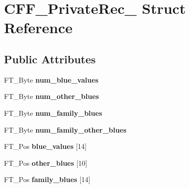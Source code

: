 \hypertarget{struct_c_f_f___private_rec__}{}\section{C\+F\+F\+\_\+\+Private\+Rec\+\_\+ Struct Reference}
\label{struct_c_f_f___private_rec__}
\subsection*{Public Attributes}
\begin{DoxyCompactItemize}
\item 
\mbox{\label{struct_c_f_f___private_rec___a0cb80c682054b8164c7acf80268f2129}} 
F\+T\+\_\+\+Byte {\bfseries num\+\_\+blue\+\_\+values}
\item 
\mbox{\label{struct_c_f_f___private_rec___a9b243fb3076cb047103f9e4cd4e97e92}} 
F\+T\+\_\+\+Byte {\bfseries num\+\_\+other\+\_\+blues}
\item 
\mbox{\label{struct_c_f_f___private_rec___a8fa5567b17831b3b9449c8866de46cdc}} 
F\+T\+\_\+\+Byte {\bfseries num\+\_\+family\+\_\+blues}
\item 
\mbox{\label{struct_c_f_f___private_rec___aa6896d394b3e2aaba96ae2938f515e13}} 
F\+T\+\_\+\+Byte {\bfseries num\+\_\+family\+\_\+other\+\_\+blues}
\item 
\mbox{\label{struct_c_f_f___private_rec___a892cbb15929f6abea66c011d62f7512e}} 
F\+T\+\_\+\+Pos {\bfseries blue\+\_\+values} \mbox{[}14\mbox{]}
\item 
\mbox{\label{struct_c_f_f___private_rec___a4c06566ee6e92c12d34b7d90025df5d6}} 
F\+T\+\_\+\+Pos {\bfseries other\+\_\+blues} \mbox{[}10\mbox{]}
\item 
\mbox{\label{struct_c_f_f___private_rec___aef7b2824e54944fcdf78ac1c78beb4c5}} 
F\+T\+\_\+\+Pos {\bfseries family\+\_\+blues} \mbox{[}14\mbox{]}
\item 
\mbox{\label{struct_c_f_f___private_rec___aa39535a2dca3a460e5150f3910443076}} 

\end{DoxyCompactItemize}
